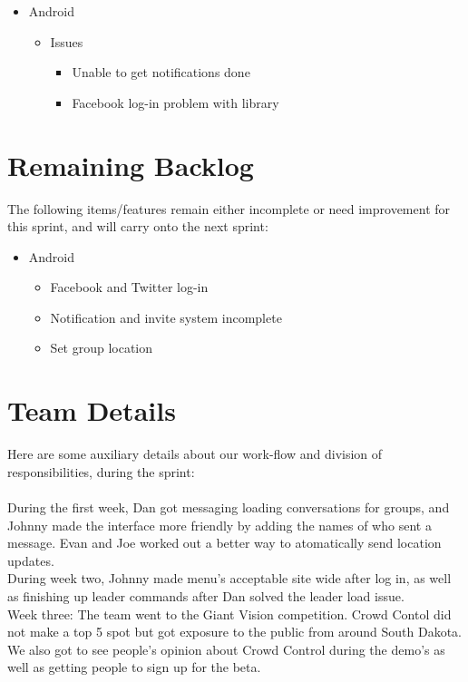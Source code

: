 \documentclass[11pt]{article}
\begin{document}
	\begin{itemize}
		\item Android
			\begin{itemize}
				\item Issues
				\begin{itemize}
					\item Unable to get notifications done
					\item Facebook log-in problem with library
				\end{itemize}
			\end{itemize}
	\end{itemize}

\section*{Remaining Backlog}
The following items/features remain either incomplete or need improvement for this sprint, and will carry onto the next sprint:
	\begin{itemize}
		\item Android
		\begin{itemize}
			\item Facebook and Twitter log-in
			\item Notification and invite system incomplete
			\item Set group location
		\end{itemize}
	\end{itemize}


	
\section*{Team Details}
Here are some auxiliary details about our work-flow and division of responsibilities, during the sprint: \\\\

During the first week, Dan got messaging loading conversations for groups, and Johnny made the interface more friendly by adding the names of who sent a message. Evan and Joe worked out a better way to atomatically send location updates.\\

During week two, Johnny made menu's acceptable site wide after log in, as well as finishing up leader commands after Dan solved the leader load issue. \\

Week three: The team went to the Giant Vision competition. Crowd Contol did not make a top 5 spot but got exposure to the public from around South Dakota. We also got to see people's opinion about Crowd Control during the demo's as well as getting people to sign up for the beta. \\
\end{document}
